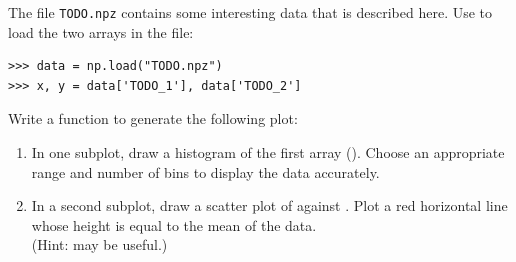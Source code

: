 \begin{problem} %
\label{prob:subplot}
The file \texttt{TODO.npz} contains some interesting data that is described here.
Use  to load the two arrays in the file:
\begin{lstlisting}
>>> data = np.load("TODO.npz")
>>> x, y = data['TODO_1'], data['TODO_2']
\end{lstlisting}

Write a function to generate the following plot:
\begin{enumerate}
\item In one subplot, draw a histogram of the first array ().
Choose an appropriate range and number of bins to display the data accurately.
\item In a second subplot, draw a scatter plot of  against .
Plot a red horizontal line whose height is equal to the mean of the  data.\\
(Hint:  may be useful.)
\end{enumerate}


\end{problem}

